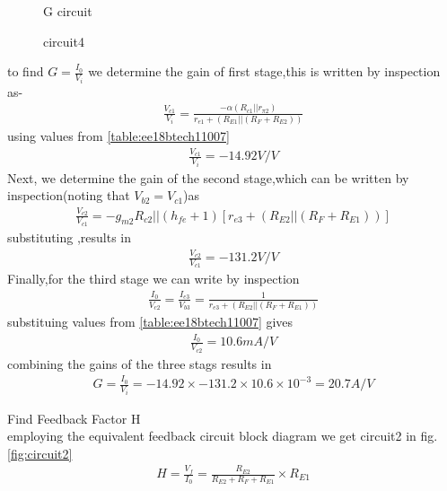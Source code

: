 \begin{enumerate}[label=\thesubsection.\arabic*.,ref=\thesubsection.\theenumi]
{\begin{figure}[!ht]
\begin{center}
		\resizebox{\columnwidth}{!}{}
	\end{center}
\caption{G circuit}
\label{fig:circuit3}
\end{figure}
\begin{figure}[!ht]
	\begin{center}
		
		\resizebox{\columnwidth}{!}{}
	\end{center}
\caption{circuit4}
\label{fig:circuit4}
\end{figure}
to find $G=\frac{I_0}{V_i}$ we determine the gain of first stage,this is written by inspection as-
\begin{align}
    \frac{V_{c1}}{V_i}=\frac{-\alpha(R_{c1}||r_{\pi2})}{r_{e1}+(R_{E1}||(R_F+R_{E2}))}
\end{align}
using values from \ref{table:ee18btech11007}
\begin{align}
\frac{V_{c1}}{V_i}=-14.92V/V     
\end{align}
Next, we determine the gain of the second stage,which can be written by inspection(noting that $V_{b2}=V_{c1}$)as
\begin{align}
    \frac{V_{c2}}{V_{c1}}=-g_{m2}{R_{c2}||(h_{fe}+1)[r_{e3}+(R_{E2}||(R_F+R_{E1}))]}
\end{align}
substituting ,results in 
\begin{align}
    \frac{V_{c2}}{V_{c1}}=-131.2 V/V
\end{align}
Finally,for the third stage we can write by inspection
\begin{align}
    \frac{I_0}{V_{c2}}=\frac{I_{e3}}{V_{b3}}=\frac{1}{r_{e3}+(R_{E2}||(R_F+R_{E1}))}
\end{align}
substituing values from \ref{table:ee18btech11007} gives
\begin{align}
    \frac{I_0}{V_{c2}}=10.6mA/V
\end{align}
combining the gains of the three stags results in
\begin{align}
G=\frac{I_0}{V_i}=-14.92\times-131.2\times10.6\times10^{-3}=20.7A/V    
\end{align}
\item Find Feedback Factor H
\\
\solution employing  the equivalent feedback circuit block diagram we get circuit2  in  fig.\ref{fig:circuit2} 
\begin{align}
    H=\frac{V_f}{I_0}=\frac{R_{E2}}{R_{E2}+R_F+R_{E1}} \times R_{E1}
\end{align}
}
\end{enumerate}
